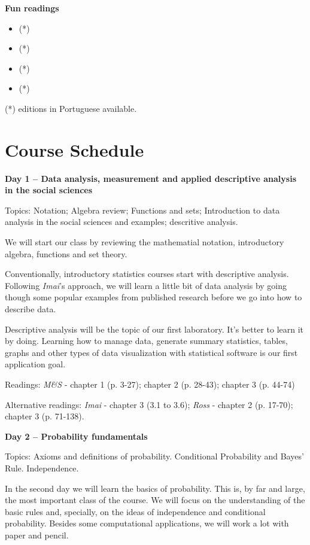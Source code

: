 \documentclass[a4paper,11pt]{article}
\begin{document}
\textbf{Fun readings}

\begin{itemize}
  \item {} (*)
  \item {} (*)
  \item {} (*)
  \item {} (*)
\end{itemize}


(*) editions in Portuguese available.

\pagebreak
\section{Course Schedule}

\textbf{Day 1 -- Data analysis, measurement and applied descriptive analysis in the social sciences}

Topics: Notation; Algebra review; Functions and sets; Introduction to data analysis in the social sciences and examples; descritive analysis.

We will start our class by reviewing the mathematial notation, introductory algebra, functions and set theory.

Conventionally, introductory statistics courses start with descriptive analysis. Following \emph{Imai}'s approach, we will learn a little bit of data analysis by going though some popular examples from published research before we go into how to describe data. 

Descriptive analysis will be the topic of our first laboratory. It's better to learn it by doing. Learning how to manage data, generate summary statistics, tables, graphs and other types of data visualization with statistical software is our first application goal.

Readings: \emph{M\&S} - chapter 1 (p. 3-27); chapter 2 (p. 28-43); chapter 3 (p. 44-74)

Alternative readings: \emph{Imai} - chapter 3 (3.1 to 3.6); \emph{Ross} - chapter 2 (p. 17-70); chapter 3 (p. 71-138).

\textbf{Day 2 -- Probability fundamentals}

Topics: Axioms and definitions of probability. Conditional Probability and Bayes' Rule. Independence.

In the second day we will learn the basics of probability. This is, by far and large, the most important class of the course. We will focus on the understanding of the basic rules and, specially, on the ideas of independence and conditional probability. Besides some computational applications, we will work a lot with paper and pencil.
\end{document}
